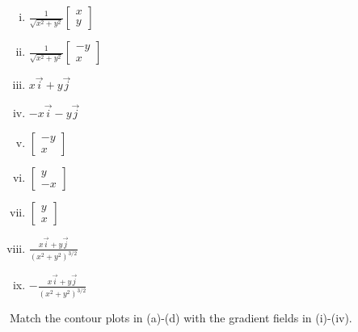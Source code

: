 \documentclass[12pt,reqno]{amsart}
\begin{document}
\begin{enumerate}[(i)]
\item $\displaystyle\frac{1}{\sqrt{x^2+y^2}}\begin{bmatrix}x \\ y \end{bmatrix}$\bigskip
\item $\displaystyle\frac{1}{\sqrt{x^2+y^2}}\begin{bmatrix}-y\\x \end{bmatrix}$\bigskip
\item $x\vec{i} + y \vec{j}$\bigskip
\item $-x\vec{i} - y \vec{j}$\bigskip
\item $\begin{bmatrix}-y \\ x \end{bmatrix}$\bigskip
\item $\begin{bmatrix}y \\ -x \end{bmatrix}$\bigskip
\item $\begin{bmatrix}y \\ x\end{bmatrix}$\bigskip
\item $\displaystyle\frac{x\vec{i} + y \vec{j}}{(x^2+y^2)^{3/2}}$\bigskip
\item $-\displaystyle\frac{x\vec{i} + y \vec{j}}{(x^2+y^2)^{3/2}}$
\end{enumerate}

\newpage
\prob Match the contour plots in (a)-(d) with the gradient fields in (i)-(iv).
\end{document}
